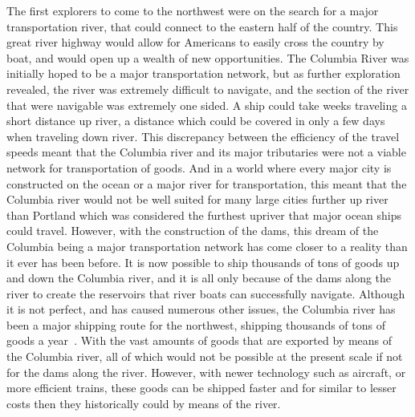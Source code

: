 \documentclass[12pt,twoside]{article}
\begin{document}
The first explorers to come to the northwest were on the search for a major
transportation river, that could connect to the eastern half of the country.
This great river highway would allow for Americans to easily cross the country
by boat, and would open up a wealth of new opportunities. The Columbia River
was initially hoped to be a major transportation network, but as further
exploration revealed, the river was extremely difficult to navigate, and the
section of the river that were navigable was extremely one sided. A ship could
take weeks traveling a short distance up river, a distance which could be
covered in only a few days when traveling down river. This discrepancy between
the efficiency of the travel speeds meant that the Columbia river and its major
tributaries were not a viable network for transportation of goods. And in a
world where every major city is constructed on the ocean or a major river for
transportation, this meant that the Columbia river would not be well suited for
many large cities further up river than Portland which was considered the
furthest upriver that major ocean ships could travel. However, with the
construction of the dams, this dream of the Columbia being a major
transportation network has come closer to a reality than it ever has been
before. It is now possible to ship thousands of tons of goods up and down the
Columbia river, and it is all only because of the dams along the river to
create the reservoirs that river boats can successfully navigate. Although it
is not perfect, and has caused numerous other issues, the Columbia river has
been a major shipping route for the northwest, shipping thousands of tons of
goods a year~\cite{TRM}. With the vast amounts of goods that are exported by
means of the Columbia river, all of which would not be possible at the present
scale if not for the dams along the river. However, with newer technology such
as aircraft, or more efficient trains, these goods can be shipped faster and
for similar to lesser costs then they historically could by means of the river.
\end{document}
